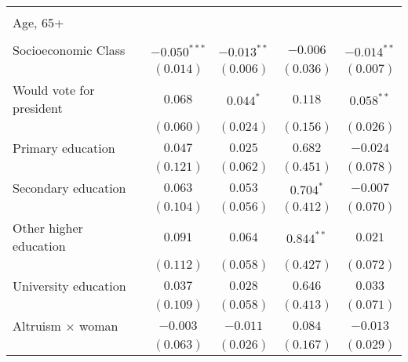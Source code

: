 \begin{table}
\begin{center}
\begin{tabular}{l c c c c}
                                                    &                &               &               &               \\
Age, 65+                                            &                &               &               &               \\
                                                    &                &               &               &               \\
Socioeconomic Class                                 & $-0.050^{***}$ & $-0.013^{**}$ & $-0.006$      & $-0.014^{**}$ \\
                                                    & $(0.014)$      & $(0.006)$     & $(0.036)$     & $(0.007)$     \\
Would vote for president                            & $0.068$        & $0.044^{*}$   & $0.118$       & $0.058^{**}$  \\
                                                    & $(0.060)$      & $(0.024)$     & $(0.156)$     & $(0.026)$     \\
Primary education                                   & $0.047$        & $0.025$       & $0.682$       & $-0.024$      \\
                                                    & $(0.121)$      & $(0.062)$     & $(0.451)$     & $(0.078)$     \\
Secondary education                                 & $0.063$        & $0.053$       & $0.704^{*}$   & $-0.007$      \\
                                                    & $(0.104)$      & $(0.056)$     & $(0.412)$     & $(0.070)$     \\
Other higher education                              & $0.091$        & $0.064$       & $0.844^{**}$  & $0.021$       \\
                                                    & $(0.112)$      & $(0.058)$     & $(0.427)$     & $(0.072)$     \\
University education                                & $0.037$        & $0.028$       & $0.646$       & $0.033$       \\
                                                    & $(0.109)$      & $(0.058)$     & $(0.413)$     & $(0.071)$     \\
Altruism $\times$ woman                             & $-0.003$       & $-0.011$      & $0.084$       & $-0.013$      \\
                                                    & $(0.063)$      & $(0.026)$     & $(0.167)$     & $(0.029)$     \\

\end{tabular}
\end{center}
\end{table}
